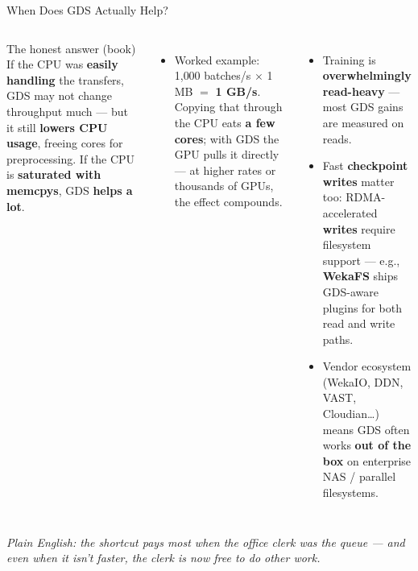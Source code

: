 \documentclass[aspectratio=169]{beamer}
\newcommand{\kw}[1]{\textbf{\textcolor{kwblue}{#1}}}
\newcommand{\pe}[1]{\par{\setlength{\fboxsep}{2.5pt}\noindent\colorbox{navy!9}{\parbox{\dimexpr\textwidth-5pt\relax}{\footnotesize\itshape Plain English: #1}}}}
\begin{document}
\begin{frame}{When Does GDS Actually Help?}
  \begin{columns}[t]
    \begin{block}{The honest answer (book)}
      \small If the CPU was \kw{easily handling} the transfers, GDS may not change
      throughput much --- but it still \kw{lowers CPU usage}, freeing cores for
      preprocessing. If the CPU is \kw{saturated with memcpys}, GDS \kw{helps a lot}.
    \end{block}
    \begin{itemize}\small
      \item Worked example: 1{,}000 batches/s $\times$ 1 MB $=$ \kw{1 GB/s}. Copying that
            through the CPU eats \kw{a few cores}; with GDS the GPU pulls it directly ---
            at higher rates or thousands of GPUs, the effect compounds.
    \end{itemize}
    \begin{itemize}\small
      \item Training is \kw{overwhelmingly read-heavy} --- most GDS gains are measured on
            reads.
      \item Fast \kw{checkpoint writes} matter too: RDMA-accelerated \kw{writes} require
            filesystem support --- e.g., \kw{WekaFS} ships GDS-aware plugins for both
            read and write paths.
      \item Vendor ecosystem (WekaIO, DDN, VAST, Cloudian\ldots) means GDS often works
            \kw{out of the box} on enterprise NAS / parallel filesystems.
    \end{itemize}
  \end{columns}
  \pe{the shortcut pays most when the office clerk was the queue --- and even when it isn't faster, the clerk is now free to do other work.}
\end{frame}
\end{document}
